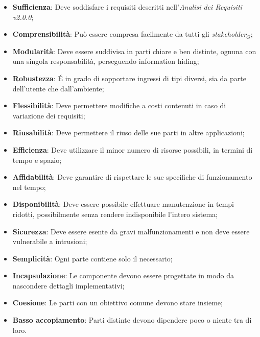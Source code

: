 \begin{itemize}
	\item \textbf{Sufficienza}: Deve soddisfare i requisiti descritti nell'\textit{Analisi dei Requisiti v2.0.0};
	\item \textbf{Comprensibilità}: Può essere compresa facilmente da tutti gli \textit{stakeholder$_{G}$};
	\item \textbf{Modularità}: Deve essere suddivisa in parti chiare e ben distinte, ognuna con una singola responsabilità, perseguendo information hiding;
	\item \textbf{Robustezza}: \'{E} in grado di sopportare ingressi di tipi diversi, sia da parte dell'utente che dall'ambiente;
	\item \textbf{Flessibilità}: Deve permettere modifiche a costi contenuti in caso di variazione dei requisiti;
	\item \textbf{Riusabilità}: Deve permettere il riuso delle sue parti in altre applicazioni;
	\item \textbf{Efficienza}: Deve utilizzare il minor numero di risorse possibili, in termini di tempo e spazio;
	\item \textbf{Affidabilità}: Deve garantire di rispettare le sue specifiche di funzionamento nel tempo;
	\item \textbf{Disponibilità}: Deve essere possibile effettuare manutenzione in tempi ridotti, possibilmente senza rendere indisponibile l'intero sistema;
	\item \textbf{Sicurezza}: Deve essere esente da gravi malfunzionamenti e non deve essere vulnerabile a intrusioni;
	\item \textbf{Semplicità}: Ogni parte contiene solo il necessario;
	\item \textbf{Incapsulazione}: Le componente devono essere progettate in modo da nascondere dettagli implementativi;
	\item \textbf{Coesione}: Le parti con un obiettivo comune devono stare insieme;
	\item \textbf{Basso accopiamento}: Parti distinte devono dipendere poco o niente tra di loro.
\end{itemize}
